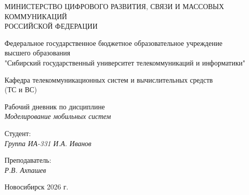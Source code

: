 \thispagestyle{empty}

\begin{center}
    МИНИСТЕРСТВО ЦИФРОВОГО РАЗВИТИЯ, СВЯЗИ И МАССОВЫХ КОММУНИКАЦИЙ \\ РОССИЙСКОЙ ФЕДЕРАЦИИ
    
    \vspace{20pt}
    
    Федеральное государственное бюджетное образовательное учреждение \\ высшего образования \\
    "Сибирский государственный университет телекоммуникаций и информатики" \\
    
    \vspace{20pt}
    
    Кафедра телекоммуникационных систем и вычислительных средств \\ (ТС и ВС)
\end{center}

\vfill

\begin{center}
    Рабочий дневник по дисциплине \\
    \textit{Моделирование мобильных систем} \\
    \vspace{10pt}
    \vspace{20pt}
\end{center}

\vfill

\noindent Студент: \\
\textit{Группа ИА-331 \hfill И.А. Иванов}

\vspace{20pt}

\noindent Преподаватель: \\
\textit{\hfill Р.В. Ахпашев}

\vfill

\begin{center}
    Новосибирск 2026 г.
\end{center}